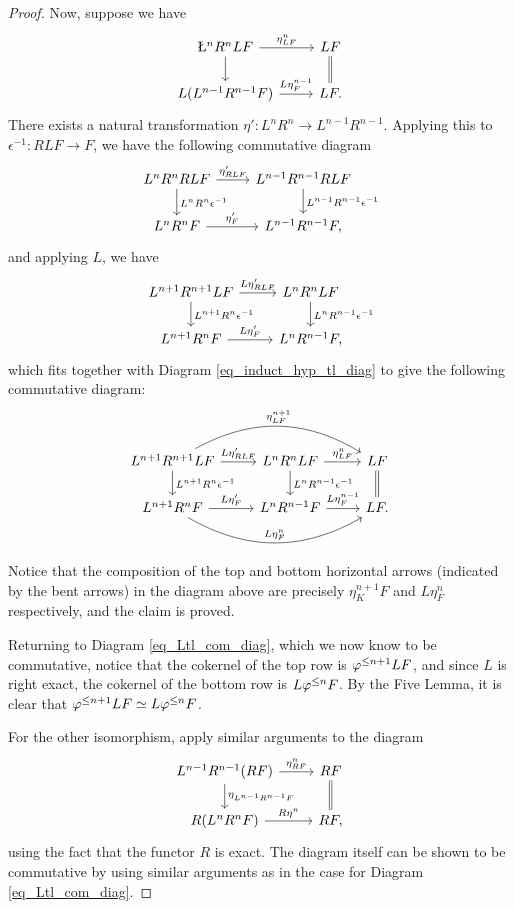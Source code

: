 \begin{proof}
Now, suppose we have
\begin{equation}\label{eq_induct_hyp_tl_diag}
\begin{tikzcd}
\L^{n}R^{n}LF \arrow{r}{\eta^{n}_{LF}} \arrow{d} &
LF \arrow[equals]{d} \\
L(L^{n - 1}R^{n - 1}F) \arrow{r}{L\eta^{n - 1}_F} &
LF.
\end{tikzcd}
\end{equation}
There exists a natural transformation $\eta': L^n R^n \to 
L^{n - 1} R^{n - 1}$. Applying this to $\epsilon^{-1}: RL F \to 
F$, we have the following commutative diagram
\[
\begin{tikzcd}
L^n R^n RL F \arrow{r}{\eta'_{RLF}} 
   \arrow{d}{L^nR^n \epsilon^{-1}} &
L^{n - 1}R^{n - 1} RLF 
   \arrow{d}{L^{n - 1}R^{n - 1}\epsilon^{-1}} \\
L^nR^n F \arrow{r}{\eta'_F} &
L^{n - 1}R^{n - 1} F,
\end{tikzcd}
\]
and applying $L$, we have
\[
\begin{tikzcd}
L^{n + 1} R^{n + 1} L F \arrow{r}{L\eta'_{RLF}} 
   \arrow{d}{L^{n + 1}R^n \epsilon^{-1}} &
L^{n}R^n LF \arrow{d}{L^nR^{n - 1}\epsilon^{-1}} \\
L^{n + 1}R^n F \arrow{r}{L\eta'_F} &
L^{n}R^{n - 1} F,
\end{tikzcd}
\]
which fits together with Diagram \ref{eq_induct_hyp_tl_diag} to 
give the following commutative diagram:
\[
\begin{tikzcd}
L^{n + 1} R^{n + 1} L F \arrow{r}{L\eta'_{RLF}} 
   \arrow{d}{L^{n + 1}R^n \epsilon^{-1}}
   \arrow[bend left]{rr}{\eta^{n + 1}_{LF}} &
L^{n}R^n LF \arrow{d}{L^nR^{n - 1}\epsilon^{-1}}
   \arrow{r}{\eta^{n}_{LF}} &
LF \arrow[equals]{d} \\
L^{n + 1}R^n F \arrow{r}{L\eta'_F} 
   \arrow[bend right]{rr}{L\eta^n_F} &
L^{n}R^{n - 1} F \arrow{r}{L\eta^{n - 1}_F} &
LF.
\end{tikzcd}
\]
Notice that the composition of the top and bottom horizontal 
arrows (indicated by the bent arrows) in the diagram above are 
precisely $\eta^{n + 1}_KF$ and $L \eta^n_F$ respectively, and
the claim is proved.

Returning to Diagram \ref{eq_Ltl_com_diag}, which we now know to 
be commutative, notice that the cokernel of the top row is 
$\varphi^{\leq n + 1}LF$, and since $L$ is right exact, the cokernel of 
the bottom row is $L\varphi^{\leq n} F$. By the Five Lemma, it is clear 
that $\varphi^{\leq n + 1}LF \simeq L\varphi^{\leq n} F$.

For the other isomorphism, apply similar arguments to the
diagram
\[
\begin{tikzcd}
L^{n - 1}R^{n - 1}(RF) \arrow{r}{\eta^n_{RF}} 
   \arrow{d}{\eta_{L^{n - 1}R^{n - 1}F}} &
RF \arrow[equals]{d} \\
R (L^n R^n F) \arrow{r}{R \eta^n} &
RF,
\end{tikzcd}
\]
using the fact that the functor $R$ is exact. The diagram itself
can be shown to be commutative by using similar arguments as in
the case for Diagram \ref{eq_Ltl_com_diag}.
\end{proof}


